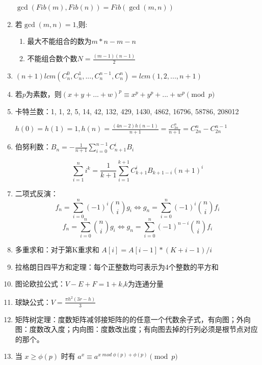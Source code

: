 \documentclass[twoside]{article}
\begin{document}
\begin{enumerate}
$\gcd(Fib(m),Fib(n))=Fib(\gcd(m,n))$

\item 若$\gcd(m,n)=1$,则:

\begin{enumerate}
\item 最大不能组合的数为$m*n-m-n$
\item 不能组合数个数$N=\frac{(m-1)(n-1)}{2}$
\end{enumerate}

\item $(n+1)lcm(C_n^0,C_n^1,...,C_n^{n-1},C_n^{n})=lcm(1,2,...,n+1)$

\item 若$p$为素数，则$(x+y+...+w)^p\equiv x^p+y^p+...+w^p\pmod p$

\item 卡特兰数：1, 1, 2, 5, 14, 42, 132, 429, 1430, 4862, 16796, 58786, 208012

$h(0)=h(1)=1,h(n)=\frac{(4n-2)h(n-1)}{n+1}=\frac{C_{2n}^n}{n+1}=C_{2n}^n-C_{2n}^{n-1}$

\item 伯努利数：$B_n = -\frac{1}{n+1} \sum_{i=0}^{n-1} C_{n+1}^i B_i$

$$\sum_{i=1}^n i^k = \frac{1}{k+1} \sum_{i=1}^{k+1}C_{k+1}^i B_{k+1-i}(n+1)^i$$

\item 二项式反演：$$f_n = \sum_{i = 0} ^ n (-1) ^ i \binom{n}{i} g_i \Leftrightarrow g_n = \sum_{i = 0} ^ n (-1) ^ i \binom{n}{i} f_i$$
$$f_n = \sum_{i = 0} ^ n \binom{n}{i} g_i \Leftrightarrow g_n = \sum_{i = 0} ^ n (-1) ^ {n - i} \binom{n}{i} f_i$$

\item 多重求和：对于第K重求和 $A[i]=A[i-1]*(K+i-1)/i$

\item 拉格朗日四平方和定理：每个正整数均可表示为4个整数的平方和

\item 图论欧拉公式：$V-E+F=1+k$,$k$为连通分量

\item 球缺公式：$V=\frac{\pi h^2(3r-h)}{3}$

\item 矩阵树定理：度数矩阵减邻接矩阵的的任意一个代数余子式，有向图；外向图：度数改入度；内向图：度数改出度；有向图去掉的行列必须是根节点对应的那个。

\item 当 $x\geq\phi(p)$ 时有 $a^x\equiv a^{x \; mod \; \phi(p) + \phi(p)}\pmod p$


\end{enumerate}
\end{document}
